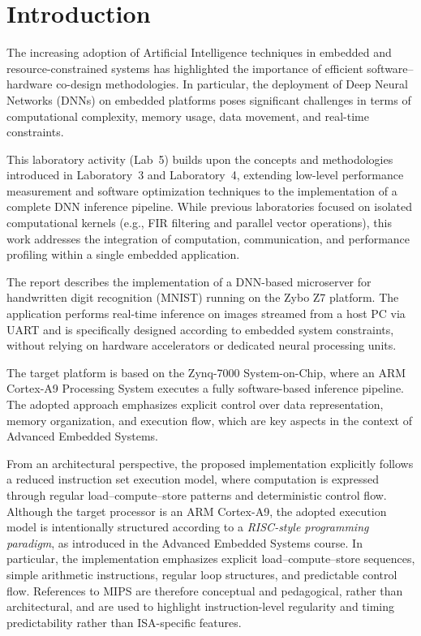 \chapter{Introduction}

The increasing adoption of Artificial Intelligence techniques in embedded and
resource-constrained systems has highlighted the importance of efficient
software--hardware co-design methodologies.
In particular, the deployment of Deep Neural Networks (DNNs) on embedded platforms
poses significant challenges in terms of computational complexity, memory usage,
data movement, and real-time constraints.

This laboratory activity (Lab~5) builds upon the concepts and methodologies
introduced in Laboratory~3 and Laboratory~4, extending low-level performance
measurement and software optimization techniques to the implementation of a
complete DNN inference pipeline.
While previous laboratories focused on isolated computational kernels
(e.g., FIR filtering and parallel vector operations), this work addresses the
integration of computation, communication, and performance profiling within a
single embedded application.

The report describes the implementation of a DNN-based microserver for handwritten
digit recognition (MNIST) running on the Zybo Z7 platform.
The application performs real-time inference on images streamed from a host PC via
UART and is specifically designed according to embedded system constraints,
without relying on hardware accelerators or dedicated neural processing units.

The target platform is based on the Zynq-7000 System-on-Chip, where an ARM Cortex-A9
Processing System executes a fully software-based inference pipeline.
The adopted approach emphasizes explicit control over data representation,
memory organization, and execution flow, which are key aspects in the context of
Advanced Embedded Systems.

From an architectural perspective, the proposed implementation explicitly follows
a reduced instruction set execution model, where computation is expressed through
regular load--compute--store patterns and deterministic control flow.
Although the target processor is an ARM Cortex-A9, the adopted execution model
is intentionally structured according to a \emph{RISC-style programming paradigm},
as introduced in the Advanced Embedded Systems course.
In particular, the implementation emphasizes explicit load--compute--store
sequences, simple arithmetic instructions, regular loop structures, and predictable
control flow.
References to MIPS are therefore conceptual and pedagogical, rather than
architectural, and are used to highlight instruction-level regularity and timing
predictability rather than ISA-specific features.


